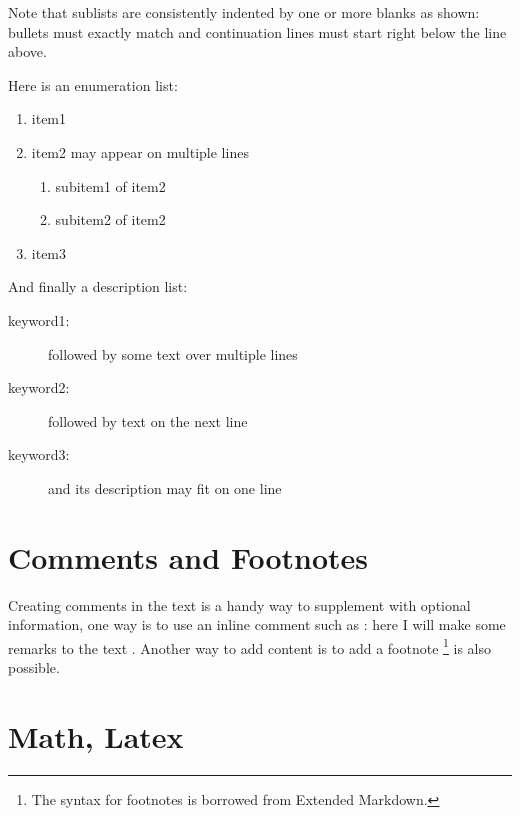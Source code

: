 \documentclass[%
twocolumn,
twoside,                 %
final,                   %
10pt]{article}
\newcommand{\shortinlinecomment}[3]{{\color{red}{\bf #1}: #2}}
\begin{document}
\noindent
Note that sublists are consistently indented by one or more blanks as
shown: bullets must exactly match and continuation lines must start
right below the line above.

Here is an enumeration list:

\begin{enumerate}
\item item1

\item item2
   may appear on
   multiple lines
\begin{enumerate}

 \item subitem1 of item2

 \item subitem2 of item2

\end{enumerate}

\noindent
\item item3
\end{enumerate}

\noindent
And finally a description list:

\begin{description}
 \item[keyword1:] 
   followed by
   some text
   over multiple
   lines

 \item[keyword2:] 
   followed by text on the next line

 \item[keyword3:] 
   and its description may fit on one line
\end{description}

\noindent
\section{Comments and Footnotes}
\label{sec:com}

Creating comments in the text is a handy way to supplement with optional information, one way is to use an inline comment such as \shortinlinecomment{hpl 1}{ here I will make some remarks to the text }{ here I will make }. Another way to add content is to add a footnote \footnote{The syntax for footnotes is borrowed from Extended Markdown.} is also possible.



\section{Math, Latex}
\label{sec:math}
\end{document}
